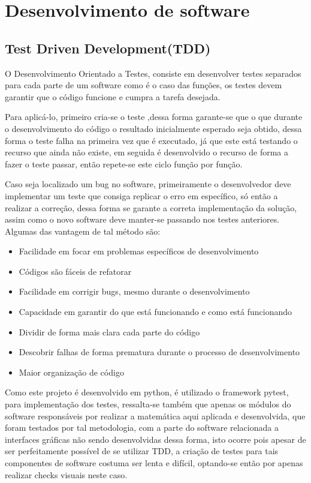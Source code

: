\section{Desenvolvimento de software}

\subsection{Test Driven Development(TDD)}

O  Desenvolvimento Orientado a Testes,  consiste em desenvolver testes separados para cada parte de um software como é o caso das funções, os testes devem garantir que o código funcione e cumpra a tarefa desejada.

Para aplicá-lo, primeiro cria-se o teste ,dessa forma garante-se que o que durante o desenvolvimento do código o resultado inicialmente esperado seja obtido, dessa forma o teste falha na primeira vez que é executado, já que este está testando o recurso que ainda não existe, em seguida é desenvolvido o recurso de forma a fazer o teste passar, então repete-se este ciclo função por função. 

Caso seja localizado um bug no software, primeiramente o desenvolvedor deve implementar um teste que consiga replicar o erro em específico, só então a realizar a correção, dessa forma se garante a correta implementação da solução, assim como o novo software deve manter-se passando nos testes anteriores. Algumas das vantagem de tal método são:
\begin{itemize}
    \item Facilidade em focar em problemas específicos de desenvolvimento
    \item Códigos são fáceis de refatorar
    \item Facilidade em corrigir bugs, mesmo durante o desenvolvimento
    \item Capacidade em garantir do que está funcionando e como está funcionando
    \item Dividir de forma mais clara cada parte do código 
    \item Descobrir falhas de forma prematura durante o processo de desenvolvimento
    \item Maior organização de código
\end{itemize}

Como este projeto é desenvolvido em python, é utilizado o framework pytest, para implementação dos testes, ressalta-se também que apenas os módulos do software responsáveis por realizar a matemática aqui aplicada e desenvolvida, que foram testados por tal metodologia, com a parte do software relacionada a interfaces gráficas não sendo desenvolvidas dessa forma, isto ocorre pois apesar de ser perfeitamente possível de se utilizar TDD, a criação de testes para tais componentes de software costuma ser lenta e difícil, optando-se então por apenas realizar checks visuais neste caso.

